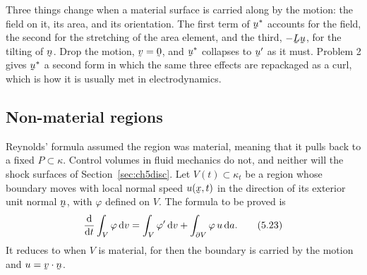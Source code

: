 \begin{remark}\label{rem:fluxwhy}
Three things change when a material surface is carried along by the
motion: the field on it, its area, and its orientation. The first term of
$\bu^{*}$ accounts for the field, the second for the stretching of the
area element, and the third, $-\bL\bu$, for the tilting of $\bn$. Drop the
motion, $\bv=\bze$, and $\bu^{*}$ collapses to $\bu'$ as it must. Problem 2
gives $\bu^{*}$ a second form in which the same three effects are
repackaged as a curl, which is how it is usually met in electrodynamics.
\end{remark}

\subsection{Non-material regions}\label{sec:nonmat}

Reynolds' formula assumed the region was material, meaning that it pulls
back to a fixed $P\subset\kappa$. Control volumes in fluid mechanics do not, and
neither will the shock surfaces of Section~\ref{sec:ch5disc}. Let
$V(t)\subset\kappa_{t}$ be a region whose boundary moves with local normal
speed $u(\bx,t)$ in the direction of its exterior unit normal $\bn$, with
$\varphi$ defined on $V$. The formula to be proved is
\begin{equation}
   \frac{\mathrm{d}}{\mathrm{d} t}\int_{V}\varphi\,\mathrm{d} v
   =\int_{V}\varphi'\,\mathrm{d} v+\int_{\partial V}\varphi\,u\,\mathrm{d} a .
   \tag{5.23}\label{eq:5.23}
\end{equation}
It reduces to  when $V$ is material, for then the boundary is
carried by the motion and $u=\ip\bv\bn$.


